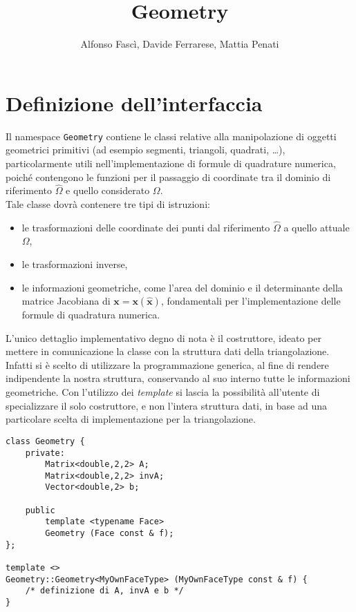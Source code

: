 \documentclass[a4paper,10pt,twoside]{amsart}
\title{Geometry}
\author{Alfonso Fascì, Davide Ferrarese, Mattia Penati}
\theoremstyle{remark}
\theoremstyle{definition}
\renewcommand{\vector}{\mathbf}
\renewcommand{\tt}{\texttt}
\begin{document}
\maketitle

\section{Definizione dell'interfaccia}

Il namespace \tt{Geometry} contiene le classi relative alla manipolazione di oggetti geometrici primitivi (ad esempio segmenti, triangoli, quadrati, \dots), particolarmente utili nell'implementazione di formule di quadrature numerica, poiché contengono le funzioni per il passaggio di coordinate tra il dominio di riferimento $\hat{\Omega}$ e quello considerato $\Omega$. \\
Tale classe dovrà contenere tre tipi di istruzioni:
\begin{itemize}
	\item le trasformazioni delle coordinate dei punti dal riferimento $\hat{\Omega}$ a quello attuale $\Omega$,
	\item le trasformazioni inverse,
	\item le informazioni geometriche, come l'area del dominio e il determinante della matrice Jacobiana di $\vector{x}=\vector{x}(\hat{\vector{x}})$, fondamentali per l'implementazione delle formule di quadratura numerica.
\end{itemize}

L'unico dettaglio implementativo degno di nota è il costruttore, ideato per mettere in comunicazione la classe con la struttura dati della triangolazione. Infatti si è scelto di utilizzare la programmazione generica, al fine di rendere indipendente la nostra struttura, conservando al suo interno tutte le informazioni geometriche. Con l'utilizzo dei \emph{template} si lascia la possibilità all'utente di specializzare il solo costruttore, e non l'intera struttura dati, in base ad una particolare scelta di implementazione per la triangolazione.

\begin{lstlisting}
class Geometry {
	private:
		Matrix<double,2,2> A;
		Matrix<double,2,2> invA;
		Vector<double,2> b;

	public
		template <typename Face>
		Geometry (Face const & f);
};

template <>
Geometry::Geometry<MyOwnFaceType> (MyOwnFaceType const & f) {
	/* definizione di A, invA e b */
}
\end{lstlisting}
\end{document}
